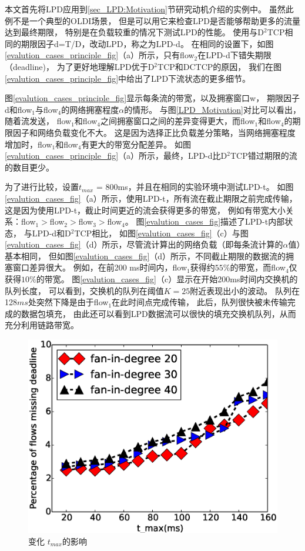 本文首先将LPD应用到\ref{sec_LPD:Motivation}节研究动机介绍的实例中。
虽然此例不是一个典型的OLDI场景，
但是可以用它来检查LPD是否能够帮助更多的流量达到最终期限，
特别是在负载较重的情况下测试LPD的性能。
使用与D$^2$TCP相同的期限因子d=T/D，改动LPD，称之为LPD-d。
在相同的设置下，如图\ref{evalution_cases_principle_fig}（a）所示，只有flow$_2$在LPD-d下错失期限（deadline)，
为了更好地理解LPD优于D$^2$TCP和DCTCP的原因，
我们在图\ref{evalution_cases_principle_fig}中给出了LPD下流状态的更多细节。


图\ref{evalution_cases_principle_fig}显示每条流的带宽，以及拥塞窗口w，
期限因子d和flow$_1$与flow$_4$的网络拥塞程度$\alpha$的情形。
与图\ref{LPD_Motivation}对比可以看出，随着流发送，
flow$_1$和flow$_4$之间拥塞窗口之间的差异变得更大，而flow$_1$和flow$_4$的期限因子和网络负载变化不大。
这是因为选择正比负载差分策略，当网络拥塞程度增加时，flow$_1$和flow$_4$有更大的带宽分配差异。
如图\ref{evalution_cases_principle_fig}（a）所示，最终，LPD-d比D$^2$TCP错过期限的流的数目更少。



为了进行比较，设置$t_{max}$ = 800ms，并且在相同的实验环境中测试LPD-t。
如图\ref{evalution_cases_fig}（a）所示，使用LPD-t，所有流在截止期限之前完成传输，
这是因为使用LPD-t，截止时间更近的流会获得更多的带宽，
例如有带宽大小关系：flow$_1>$flow$_2>$flow$_3>$flow$_4$。
图\ref{evalution_cases_fig}描述了LPD-t内部状态，
与LPD-d和D$^2$TCP相比，
如图\ref{evalution_cases_fig}（c）与图\ref{evalution_cases_fig}（d）所示，尽管流计算出的网络负载（即每条流计算的$\alpha$值）基本相同，
但如图\ref{evalution_cases_fig}（d）所示，不同截止期限的数据流的拥塞窗口差异很大。
例如，在前200 ms时间内，flow$_1$获得约$55\%$的带宽，而flow$_4$仅获得$10\%$的带宽。
图\ref{evalution_cases_fig}（c）显示在开始200ms时间内交换机的队列长度，
可以看到，交换机的队列在阈值$K = 25$附近表现出小的波动。
队列在128$ms$处突然下降是由于flow$_1$在此时间点完成传输，
此后，队列很快被未传输完成的数据包填充，
由此还可以看到LPD数据流可以很快的填充交换机队列，从而充分利用链路带宽。
\begin{figure}[H] 
  \centering
  \includegraphics[width=0.8\columnwidth]{figures/LPD/evaluation_3/DMAX.eps}
  \caption{变化 $t_{max}$的影响}
  \label{tmax-fig}
\end{figure}

